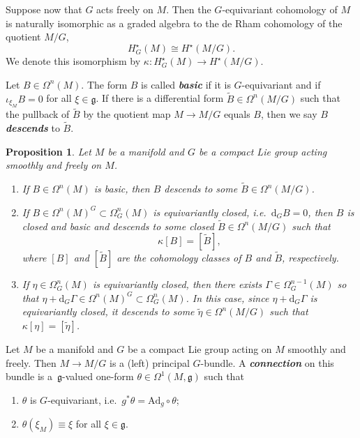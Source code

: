 \documentclass[pdftex]{sigma}
\newtheorem{Proposition}[Theorem]{Proposition}
\numberwithin{equation}{section}
\newcommand{\deff}[1]{\textbf{\emph{#1}}}
\newcommand{\func}[3]{#1 \colon #2 \to #3}
\newcommand{\litlet}{\renewcommand{\labelenumi}{(\alph{enumi})}}
\begin{document}
Suppose now that $G$ acts freely on $M$.  Then the $G$-equivariant cohomology of $M$ is naturally isomorphic as a graded algebra to the de Rham cohomology of the quotient $M/G$,
\[
  H_G^{\star}(M) \cong H^{\star} (M/G).
\]
We denote this isomorphism by $\func{\kappa}{H_G^{\star}(M)}{H^{\star}(M/G)}$.

Let $B \in \Omega^n(M)$.  The form $B$ is called \deff{basic} if it is $G$-equivariant and if $\iota_{\xi_M} B = 0$ for all $\xi \in \mathfrak{g}$.  If there is a dif\/ferential form $\widetilde{B} \in \Omega^n(M/G)$ such that the pullback of $\widetilde{B}$ by the quotient map $M \to M/G$ equals $B$, then we say $B$ \deff{descends} to $\widetilde{B}$.


\begin{Proposition}
Let $M$ be a manifold and $G$ be a compact Lie group acting smoothly and freely on $M$.
\begin{enumerate} \itemsep=0pt\litlet
  \item If $B \in \Omega^n(M)$ is basic, then $B$ descends to some $\widetilde{B} \in \Omega^n(M/G)$.
  \item If $B \in \Omega^n(M)^G \subset \Omega_G^n(M)$ is equivariantly closed, i.e.\ $\mathrm{d}_G B = 0$, then $B$ is closed and basic and descends to some closed $\widetilde{B} \in \Omega^n(M/G)$ such that
    \[
      \kappa[B] = [\widetilde{B}],
    \]
  where $[B]$ and $[\widetilde{B}]$ are the cohomology classes of $B$ and $\widetilde{B}$, respectively.
  \item If $\eta \in \Omega_G^n(M)$ is equivariantly closed, then there exists $\Gamma \in \Omega_G^{n-1}(M)$ so that $\eta + \mathrm{d}_G \Gamma \in \Omega^n(M)^G \subset \Omega_G^n(M)$.  In this case, since $\eta + \mathrm{d}_G \Gamma$ is equivariantly closed, it descends to some $\widetilde{\eta} \in \Omega^n(M/G)$ such that $\kappa[\eta] = [\widetilde{\eta}]$.
\end{enumerate}
\end{Proposition}


\begin{Definition} \label{def3}
Let $M$ be a manifold and $G$ be a compact Lie group acting on $M$ smoothly and freely.  Then $M \to M/G$ is a (left) principal $G$-bundle.  A \deff{connection} on this bundle is a~$\mathfrak{g}$-valued one-form $\theta \in \Omega^1(M,\mathfrak{g})$ such that
\begin{enumerate}\itemsep=0pt
  \item $\theta$ is $G$-equivariant, i.e.\ $g^* \theta = \mathrm{Ad}_g \circ \theta$;
  \item $\theta (\xi_M) \equiv \xi$ for all $\xi \in \mathfrak{g}$.
\end{enumerate}
\end{Definition}
\end{document}

